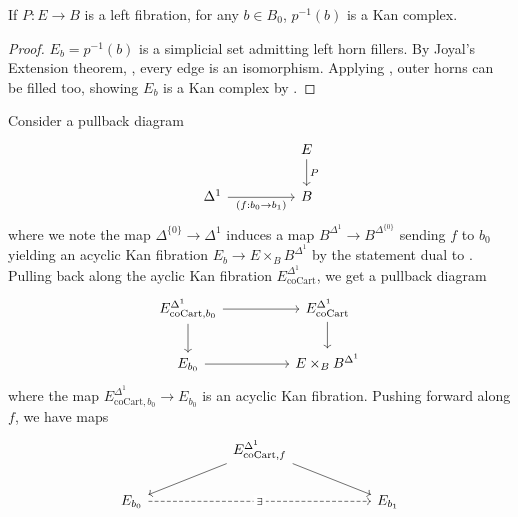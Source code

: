 \begin{proposition}\label{prop: fiber over any 0-simplex is Kan}
    If $P:E\to B$ is a left fibration, for any $b\in B_{0}$, $p^{-1}(b)$ is a Kan complex. 
\end{proposition}
\begin{proof}
    $E_{b}=p^{-1}(b)$ is a simplicial set admitting left horn fillers. By Joyal's Extension theorem, , every edge is an isomorphism. Applying , outer horns can be filled too, showing $E_{b}$ is a Kan complex by .
\end{proof}
Consider a pullback diagram 
$$%
\begin{tikzcd}
	&& E \\
	{\Delta^{1}} && B
	\arrow["P", from=1-3, to=2-3]
	\arrow["{(f:b_{0}\to b_{1})}"', from=2-1, to=2-3]
\end{tikzcd}$$
where we note the map $\Delta^{\{0\}}\to\Delta^{1}$ induces a map $B^{\Delta^{1}}\to B^{\Delta^{\{0\}}}$ sending $f$ to $b_{0}$ yielding an acyclic Kan fibration $E_{b}\to E\times_{B}B^{\Delta^{1}}$ by the statement dual to . Pulling back along the ayclic Kan fibration $E_{\mathrm{coCart}}^{\Delta^{1}}$, we get a pullback diagram 
$$%
\begin{tikzcd}
	{E_{\mathrm{coCart},b_{0}}^{\Delta^{1}}} && {E_{\mathrm{coCart}}^{\Delta^{1}}} \\
	{E_{b_{0}}} && {E\times_{B}B^{\Delta^{1}}}
	\arrow[from=1-1, to=1-3]
	\arrow[from=1-3, to=2-3]
	\arrow[from=1-1, to=2-1]
	\arrow[from=2-1, to=2-3]
\end{tikzcd}$$
where the map $E_{\mathrm{coCart},b_{0}}^{\Delta^{1}}\to E_{b_{0}}$ is an acyclic Kan fibration. Pushing forward along $f$, we have maps 
$$%
\begin{tikzcd}
	&& {E_{\mathrm{coCart},f}^{\Delta^{1}}} \\
	{E_{b_{0}}} & {} && {} & {E_{b_{1}}}
	\arrow[from=1-3, to=2-1]
	\arrow[from=1-3, to=2-5]
	\arrow["\exists"{description}, dashed, from=2-1, to=2-5]
\end{tikzcd}$$

